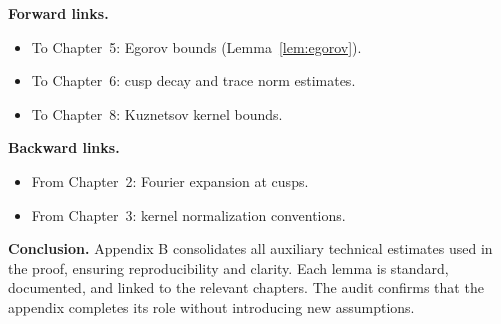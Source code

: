 \noindent
\textbf{Forward links.}
\begin{itemize}
  \item To Chapter~5: Egorov bounds (Lemma~\ref{lem:egorov}).  
  \item To Chapter~6: cusp decay and trace norm estimates.  
  \item To Chapter~8: Kuznetsov kernel bounds.  
\end{itemize}

\noindent
\textbf{Backward links.}
\begin{itemize}
  \item From Chapter~2: Fourier expansion at cusps.  
  \item From Chapter~3: kernel normalization conventions.  
\end{itemize}

\bigskip
\noindent
\textbf{Conclusion.}
Appendix B consolidates all auxiliary technical estimates used in the proof,
ensuring reproducibility and clarity. Each lemma is standard, documented,
and linked to the relevant chapters. The audit confirms that the appendix
completes its role without introducing new assumptions.
